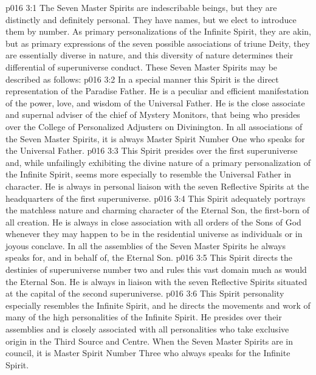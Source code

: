\vs p016 3:1 The Seven Master Spirits are indescribable beings, but they are distinctly and definitely personal. They have names, but we elect to introduce them by number. As primary personalizations of the Infinite Spirit, they are akin, but as primary expressions of the seven possible associations of triune Deity, they are essentially diverse in nature, and this diversity of nature determines their differential of superuniverse conduct. These Seven Master Spirits may be described as follows:
\vs p016 3:2  In a special manner this Spirit is the direct representation of the Paradise Father. He is a peculiar and efficient manifestation of the power, love, and wisdom of the Universal Father. He is the close associate and supernal adviser of the chief of Mystery Monitors, that being who presides over the College of Personalized Adjusters on Divinington. In all associations of the Seven Master Spirits, it is always Master Spirit Number One who speaks for the Universal Father.
\vs p016 3:3 This Spirit presides over the first superuniverse and, while unfailingly exhibiting the divine nature of a primary personalization of the Infinite Spirit, seems more especially to resemble the Universal Father in character. He is always in personal liaison with the seven Reflective Spirits at the headquarters of the first superuniverse.
\vs p016 3:4 \pc {} This Spirit adequately portrays the matchless nature and charming character of the Eternal Son, the first\hyp{}born of all creation. He is always in close association with all orders of the Sons of God whenever they may happen to be in the residential universe as individuals or in joyous conclave. In all the assemblies of the Seven Master Spirits he always speaks for, and in behalf of, the Eternal Son.
\vs p016 3:5 This Spirit directs the destinies of superuniverse number two and rules this vast domain much as would the Eternal Son. He is always in liaison with the seven Reflective Spirits situated at the capital of the second superuniverse.
\vs p016 3:6 \pc {} This Spirit personality especially resembles the Infinite Spirit, and he directs the movements and work of many of the high personalities of the Infinite Spirit. He presides over their assemblies and is closely associated with all personalities who take exclusive origin in the Third Source and Centre. When the Seven Master Spirits are in council, it is Master Spirit Number Three who always speaks for the Infinite Spirit.
